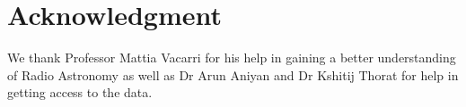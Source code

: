 \documentclass[conference]{IEEEtran}
\begin{document}

\section*{Acknowledgment}

We thank Professor Mattia Vacarri for his help in gaining a better understanding of Radio Astronomy as well as Dr Arun Aniyan and Dr Kshitij Thorat for help in getting access to the data.




\end{document}
